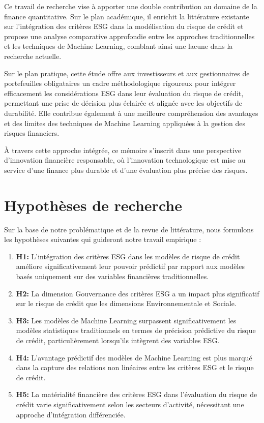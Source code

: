 Ce travail de recherche vise à apporter une double contribution au domaine de la finance quantitative. Sur le plan académique, il enrichit la littérature existante sur l'intégration des critères ESG dans la modélisation du risque de crédit et propose une analyse comparative approfondie entre les approches traditionnelles et les techniques de Machine Learning, comblant ainsi une lacune dans la recherche actuelle.

Sur le plan pratique, cette étude offre aux investisseurs et aux gestionnaires de portefeuilles obligataires un cadre méthodologique rigoureux pour intégrer efficacement les considérations ESG dans leur évaluation du risque de crédit, permettant une prise de décision plus éclairée et alignée avec les objectifs de durabilité. Elle contribue également à une meilleure compréhension des avantages et des limites des techniques de Machine Learning appliquées à la gestion des risques financiers.

À travers cette approche intégrée, ce mémoire s'inscrit dans une perspective d'innovation financière responsable, où l'innovation technologique est mise au service d'une finance plus durable et d'une évaluation plus précise des risques.

\section{Hypothèses de recherche}

Sur la base de notre problématique et de la revue de littérature, nous formulons les hypothèses suivantes qui guideront notre travail empirique :

\begin{enumerate}
    \item \textbf{H1:} L'intégration des critères ESG dans les modèles de risque de crédit améliore significativement leur pouvoir prédictif par rapport aux modèles basés uniquement sur des variables financières traditionnelles.

    \item \textbf{H2:} La dimension Gouvernance des critères ESG a un impact plus significatif sur le risque de crédit que les dimensions Environnementale et Sociale.

    \item \textbf{H3:} Les modèles de Machine Learning surpassent significativement les modèles statistiques traditionnels en termes de précision prédictive du risque de crédit, particulièrement lorsqu'ils intègrent des variables ESG.

    \item \textbf{H4:} L'avantage prédictif des modèles de Machine Learning est plus marqué dans la capture des relations non linéaires entre les critères ESG et le risque de crédit.

    \item \textbf{H5:} La matérialité financière des critères ESG dans l'évaluation du risque de crédit varie significativement selon les secteurs d'activité, nécessitant une approche d'intégration différenciée.
\end{enumerate}

